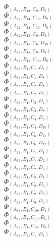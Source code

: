 \documentclass[14pt]{article}
\begin{document}
    $\Phi_{({A}_{12}, {B}_{14}, {C}_{9}, {D}_{8})}$ \\ 
    $\Phi_{({A}_{12}, {B}_{14}, {C}_{10}, {D}_{7})}$ \\ 
    $\Phi_{({A}_{12}, {B}_{14}, {C}_{10}, {D}_{8})}$ \\ 
    $\Phi_{({A}_{12}, {B}_{15}, {C}_{6}, {D}_{9})}$ \\ 
    $\Phi_{({A}_{12}, {B}_{15}, {C}_{6}, {D}_{10})}$ \\ 
    $\Phi_{({A}_{12}, {B}_{15}, {C}_{9}, {D}_{6})}$ \\ 
    $\Phi_{({A}_{12}, {B}_{15}, {C}_{10}, {D}_{6})}$ \\ 
    $\Phi_{({A}_{13}, {B}_{1}, {C}_{1}, {D}_{7})}$ \\ 
    $\Phi_{({A}_{13}, {B}_{1}, {C}_{1}, {D}_{8})}$ \\ 
    $\Phi_{({A}_{13}, {B}_{1}, {C}_{2}, {D}_{7})}$ \\ 
    $\Phi_{({A}_{13}, {B}_{1}, {C}_{2}, {D}_{8})}$ \\ 
    $\Phi_{({A}_{13}, {B}_{1}, {C}_{3}, {D}_{7})}$ \\ 
    $\Phi_{({A}_{13}, {B}_{1}, {C}_{3}, {D}_{8})}$ \\ 
    $\Phi_{({A}_{13}, {B}_{1}, {C}_{4}, {D}_{9})}$ \\ 
    $\Phi_{({A}_{13}, {B}_{1}, {C}_{4}, {D}_{10})}$ \\ 
    $\Phi_{({A}_{13}, {B}_{1}, {C}_{6}, {D}_{11})}$ \\ 
    $\Phi_{({A}_{13}, {B}_{1}, {C}_{6}, {D}_{12})}$ \\ 
    $\Phi_{({A}_{13}, {B}_{1}, {C}_{7}, {D}_{1})}$ \\ 
    $\Phi_{({A}_{13}, {B}_{1}, {C}_{7}, {D}_{2})}$ \\ 
    $\Phi_{({A}_{13}, {B}_{1}, {C}_{7}, {D}_{3})}$ \\ 
    $\Phi_{({A}_{13}, {B}_{1}, {C}_{8}, {D}_{1})}$ \\ 
    $\Phi_{({A}_{13}, {B}_{1}, {C}_{8}, {D}_{2})}$ \\ 
    $\Phi_{({A}_{13}, {B}_{1}, {C}_{8}, {D}_{3})}$ \\ 
    $\Phi_{({A}_{13}, {B}_{1}, {C}_{9}, {D}_{4})}$ \\ 
    $\Phi_{({A}_{13}, {B}_{1}, {C}_{10}, {D}_{4})}$ \\ 
    $\Phi_{({A}_{13}, {B}_{1}, {C}_{11}, {D}_{6})}$ \\ 
    $\Phi_{({A}_{13}, {B}_{1}, {C}_{12}, {D}_{6})}$ \\ 
    $\Phi_{({A}_{13}, {B}_{2}, {C}_{1}, {D}_{7})}$ \\ 
\end{document}
